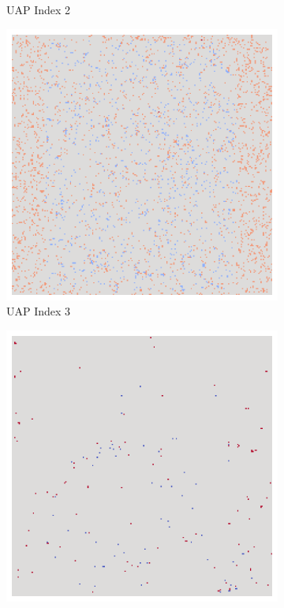 \begin{figure}[ht!]
\begin{subfigure}{0.19\linewidth}
        \caption{UAP Index 2}
    \end{subfigure}\hfill%
    \begin{subfigure}{0.19\linewidth}
        \centering
        \includegraphics[height=1\linewidth]{01-images/05-resultate/uap_resnet/uap3-resnet18-mri-n200-robustificationslevel0.png}
        \caption{UAP Index 3}
    \end{subfigure}\hfill%
    \begin{subfigure}{0.19\linewidth}
        \centering
        \includegraphics[height=1\linewidth]{01-images/05-resultate/uap_resnet/uap4-resnet18-mri-n200-robustificationslevel0.png}

\end{subfigure}
\end{figure}
